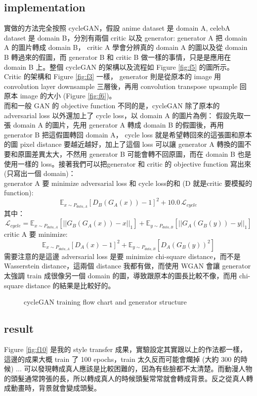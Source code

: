 \documentclass[10pt, a4paper]{article}
\begin{document}
\begin{CJK}{UTF8}{bkai}
\subsection{implementation}
實做的方法完全按照 cycleGAN，假設 anime dataset 是 domain A, celebA dataset 是 domain B，分別有兩個 critic 以及 generator: generator A 把 domain A 的圖片轉成 domain B， critic A 學會分辨真的 domain A 的圖以及從 domain B 轉過來的假圖，而 generator B 和 critic B 做一樣的事情，只是是應用在 domain B 上。整個 cycleGAN 的架構以及流程如 Figure \ref{fig:f5} 的圖所示。\\
Critic 的架構和 Figure \ref{fig:f3} 一樣， generator 則是從原本的 image 用 convolution layer downsample 三層後，再用 convolution transpose upsample
回原本 image 的大小 (Figure \ref{fig:f6})。 \\
而和一般 GAN 的 objective function 不同的是，cycleGAN 除了原本的 adversarial loss 以外還加上了 cycle loss，以 domain A 的圖片為例： 假設先取一張 domain A 的圖片，先用 generator A 轉成 domain B 的假圖後，再用 generator B 把這假圖轉回 domain A， cycle loss 就是希望轉回來的這張圖和原本的圖 pixel distance 要越近越好，加上了這個 loss 可以讓 generator A 轉換的圖不要和原圖差異太大，不然用 generator B 可能會轉不回原圖，而在 domain B 也是使用一樣的 loss。接著我們可以把generator 和 critic 的 objective function 寫出來 (只寫出一個 domain)：\\
generator A 要 minimize adversarial loss 和 cycle loss的和 (D 就是critic 要模擬的 function):
\[\mathbb{E}_{x \sim P_{data, A}}[D_{B}(G_A(x)) - 1]^2 + 10.0 \, \mathcal{L}_{cycle} \]
其中：
\[\mathcal{L}_{cycle} = \mathbb{E}_{x \sim P_{data, A}}[||G_B(G_A(x)) - x||_1] + \mathbb{E}_{y \sim P_{data, B}}[||G_A(G_B(y)) - y||_1]\]
critic A 要 minimize:
\[\mathbb{E}_{x \sim P_{data, A}} [D_A(x) - 1]^2 + \mathbb{E}_{y \sim P_{data, B}}[D_A(G_B(y))^2] \]
需要注意的是這邊 adversarial loss 是要 minimize chi-square distance，而不是 Wasserstein distance，這兩個 distance 我都有做，而使用 WGAN 會讓 generator 太強調 train 成很像另一個 domain 的圖，導致跟原本的圖長比較不像，而用 chi-square distance 的結果是比較好的。
\begin{figure}
\centering
{}
\hfill
{}
\hfill
\caption{cycleGAN training flow chart and generator structure}
\label{fig:f7}
\end{figure}

\subsection{result}
Figure \ref{fig:f10} 是我的 style transfer 成果，實驗設定其實跟以上的作法都一樣，這邊的成果大概 train 了 100 epochs，train 太久反而可能會爛掉 (大約 300 的時候) ... 可以發現轉成真人應該是比較困難的，因為有些臉都不太清楚。而動漫人物的頭髮通常誇張的長，所以轉成真人的時候頭髮常常就會轉成背景。反之從真人轉成動畫時，背景就會變成頭髮。\\


\end{CJK}
\end{document}
